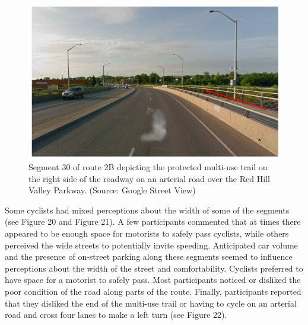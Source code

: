 \documentclass[]{elsarticle} %
\begin{document}
\begin{figure}

{\centering \includegraphics[width=0.65\linewidth]{Figure 18} 

}

\caption{Segment 30 of route 2B depicting the protected multi-use trail on the right side of the roadway on an arterial road over the Red Hill Valley Parkway. (Source: Google Street View)}\label{fig:figure-19}
\end{figure}

Some cyclists had mixed perceptions about the width of some of the
segments (see Figure 20 and Figure 21). A few participants commented
that at times there appeared to be enough space for motorists to safely
pass cyclists, while others perceived the wide streets to potentially
invite speeding. Anticipated car volume and the presence of on-street
parking along these segments seemed to influence perceptions about the
width of the street and comfortability. Cyclists preferred to have space
for a motorist to safely pass. Most participants noticed or disliked the
poor condition of the road along parts of the route. Finally,
participants reported that they disliked the end of the multi-use trail
or having to cycle on an arterial road and cross four lanes to make a
left turn (see Figure 22).
\end{document}
